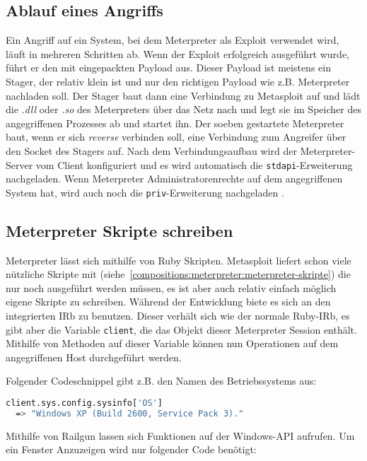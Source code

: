 \subsection{Ablauf eines Angriffs}

Ein Angriff auf ein System, bei dem Meterpreter als Exploit verwendet
wird, läuft in mehreren Schritten ab. Wenn der Exploit erfolgreich
ausgeführt wurde, führt er den mit eingepackten Payload aus. Dieser
Payload ist meistens ein Stager, der relativ klein ist und nur den
richtigen Payload wie z.B. Meterpreter nachladen soll. Der Stager baut
dann eine Verbindung zu Metasploit auf und lädt die \textit{.dll} oder
\textit{.so} des Meterpreters über das Netz nach und legt sie im Speicher
des angegriffenen Prozesses ab und startet ihn. Der soeben gestartete
Meterpreter baut, wenn er sich \textit{reverse} verbinden soll, eine
Verbindung zum Angreifer über den Socket des Stagers auf. Nach dem
Verbindungsaufbau wird der Meterpreter-Server vom Client konfiguriert
und es wird automatisch die \texttt{stdapi}-Erweiterung nachgeladen.
Wenn Meterpreter Administratorenrechte auf dem angegriffenen System hat,
wird auch noch die \texttt{priv}-Erweiterung nachgeladen
\cite{offensive-security-meterpreter}.

\subsection{Meterpreter Skripte schreiben}

Meterpreter lässt sich mithilfe von Ruby Skripten. Metasploit liefert
schon viele nützliche Skripte mit (siehe~\ref{compositions:meterpreter:meterpreter-skripte})
die nur noch ausgeführt werden müssen, es ist aber auch relativ einfach
möglich eigene Skripte zu schreiben. Während der Entwicklung biete es
sich an den integrierten IRb zu benutzen. Dieser verhält sich wie der
normale Ruby-IRb, es gibt aber die Variable \texttt{client}, die das
Objekt dieser Meterpreter Session enthält. Mithilfe von Methoden auf
dieser Variable können nun Operationen auf dem angegriffenen Host
durchgeführt werden.

Folgender Codeschnippel gibt z.B. den Namen des Betriebssystems aus:
\begin{lstlisting}[language=bash]
  client.sys.config.sysinfo['OS']
  => "Windows XP (Build 2600, Service Pack 3)."
\end{lstlisting}

Mithilfe von Railgun lassen sich Funktionen auf der Windows-API aufrufen.
Um ein Fenster Anzuzeigen wird nur folgender Code benötigt:

